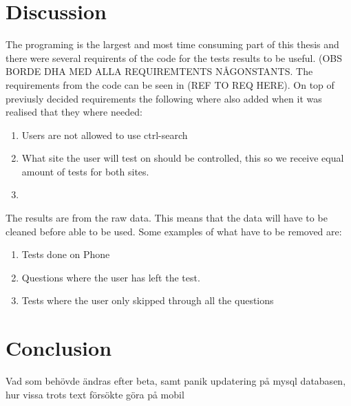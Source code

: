 \section{Discussion}
The programing is the largest and most time consuming part of this thesis and there were several requirents of the code for the tests results to be useful. (OBS BORDE DHA MED ALLA REQUIREMTENTS NÅGONSTANTS. The requirements from the code can be seen in (REF TO REQ HERE). On top of previusly decided requirements the following where also added when it was realised that they where needed: 
 \begin{enumerate}
 	\item Users are not allowed to use ctrl-search
 	\item What site the user will test on should be controlled, this so we receive equal amount of tests for both sites.
 	\item 
 \end{enumerate}

The results are from the raw data. This means that the data will have to be cleaned before able to be used. Some examples of what have to be removed are: 

\begin{enumerate}
	\item Tests done on Phone
	\item Questions where the user has left the test.
	\item Tests where the user only skipped through all the questions
\end{enumerate}






\section{Conclusion}
Vad som behövde ändras efter beta, samt panik updatering på mysql databasen, hur vissa trots text försökte göra på mobil
